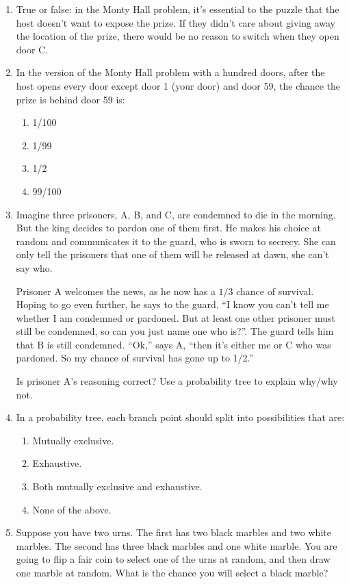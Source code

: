 \documentclass[justified]{tufte-book}
\providecommand{\tightlist}{%
  \setlength{\itemsep}{0pt}\setlength{\parskip}{0pt}}
\begin{document}
\begin{enumerate}
\item
  True or false: in the Monty Hall problem, it's essential to the puzzle that the host doesn't want to expose the prize. If they didn't care about giving away the location of the prize, there would be no reason to switch when they open door C.
\item
  In the version of the Monty Hall problem with a hundred doors, after the host opens every door except door 1 (your door) and door 59, the chance the prize is behind door 59 is:

  \begin{enumerate}
  \def\labelenumii{\alph{enumii}.}
  \tightlist
  \item
    1/100
  \item
    1/99
  \item
    1/2
  \item
    99/100
  \end{enumerate}
\item
  Imagine three prisoners, A, B, and C, are condemned to die in the morning. But the king decides to pardon one of them first. He makes his choice at random and communicates it to the guard, who is sworn to secrecy. She can only tell the prisoners that one of them will be released at dawn, she can't say who.

  Prisoner A welcomes the news, as he now has a \(1/3\) chance of survival. Hoping to go even further, he says to the guard, ``I know you can't tell me whether I am condemned or pardoned. But at least one other prisoner must still be condemned, so can you just name one who is?''. The guard tells him that B is still condemned. ``Ok,'' says A, ``then it's either me or C who was pardoned. So my chance of survival has gone up to 1/2.''

  Is prisoner A's reasoning correct? Use a probability tree to explain why/why not.
\item
  In a probability tree, each branch point should split into possibilities that are:

  \begin{enumerate}
  \def\labelenumii{\alph{enumii}.}
  \tightlist
  \item
    Mutually exclusive.
  \item
    Exhaustive.
  \item
    Both mutually exclusive and exhaustive.
  \item
    None of the above.
  \end{enumerate}
\item
  Suppose you have two urns. The first has two black marbles and two white marbles. The second has three black marbles and one white marble. You are going to flip a fair coin to select one of the urns at random, and then draw one marble at random. What is the chance you will select a black marble?


\end{enumerate}
\end{document}

